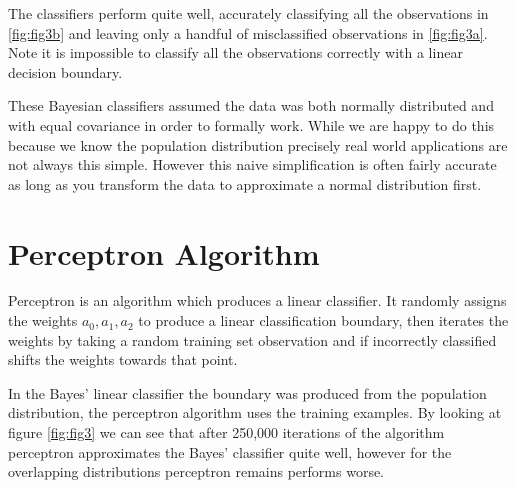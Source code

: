 \documentclass[a4paper,11pt, twocolumn]{article}
\begin{document}
The classifiers perform quite well, accurately classifying all the observations in \ref{fig:fig3b} and leaving only a handful of misclassified observations in \ref{fig:fig3a}. Note it is impossible to classify all the observations correctly with a linear decision boundary.

These Bayesian classifiers assumed the data was both normally distributed and with equal covariance in order to formally work. While we are happy to do this because we know the population distribution precisely real world applications are not always this simple. However this naive simplification is often fairly accurate as long as you transform the data to approximate a normal distribution first. 
 
\section{Perceptron Algorithm}

Perceptron is an algorithm which produces a linear classifier. It randomly assigns the weights $a_0, a_1, a_2$ to produce a linear classification boundary, then iterates the weights by taking a random training set observation and if incorrectly classified shifts the weights towards that point. 

In the Bayes' linear classifier the boundary was produced from the population distribution, the perceptron algorithm uses the training examples. By looking at figure \ref{fig:fig3} we can see that after 250,000 iterations of the algorithm perceptron approximates the Bayes' classifier quite well, however for the overlapping distributions perceptron remains performs worse. 
\end{document}
